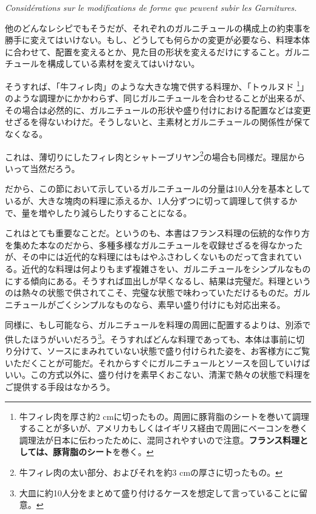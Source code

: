 \begin{main}
\vspace{-1\zw}
\begin{center}
\textit{Considérations sur le modifications de forme que peuvent subir les Garnitures.}
\end{center}
\vspace{1\zw}


他のどんなレシピでもそうだが、それぞれのガルニチュールの構成上の約束事を勝手に変えてはいけない。もし、どうしても何らかの変更が必要なら、料理本体に合わせて、配置を変えるとか、見た目の形状を変えるだけにすること。ガルニチュールを構成している素材を変えてはいけない。

そうすれば、「牛フィレ肉」のような大きな塊で供する料理か、「トゥルヌド
\footnote{牛フィレ肉を厚さ約2
  cmに切ったもの。周囲に豚背脂のシートを巻いて調理することが多いが、アメリカもしくはイギリス経由で周囲にベーコンを巻く調理法が日本に伝わったために、混同されやすいので注意。\textbf{フランス料理としては、豚背脂のシート}を巻く。}」のような調理かにかかわらず、同じガルニチュールを合わせることが出来るが、その場合は必然的に、ガルニチュールの形状や盛り付けにおける配置などは変更せざるを得ないわけだ。そうしないと、主素材とガルニチュールの関係性が保てなくなる。

これは、薄切りにしたフィレ肉とシャトーブリヤン\footnote{牛フィレ肉の太い部分、およびそれを約3
  cmの厚さに切ったもの。}の場合も同様だ。理屈からいって当然だろう。

だから、この節において示しているガルニチュールの分量は10人分を基本としているが、大きな塊肉の料理に添えるか、1人分ずつに切って調理して供するかで、量を増やしたり減らしたりすることになる。

これはとても重要なことだ。というのも、本書はフランス料理の伝統的な作り方を集めた本なのだから、多種多様なガルニチュールを収録せざるを得なかったが、その中には近代的な料理にはもはやふさわしくないものだって含まれている。近代的な料理は何よりもまず複雑さをい、ガルニチュールをシンプルなものにする傾向にある。そうすれば皿出しが早くなるし、結果は完璧だ。料理というのは熱々の状態で供されてこそ、完璧な状態で味わっていただけるものだ。ガルニチュールがごくシンプルなものなら、素早い盛り付けにも対応出来る。

同様に、もし可能なら、ガルニチュールを料理の周囲に配置するよりは、別添で供したほうがいいだろう\footnote{大皿に約10人分をまとめて盛り付けるケースを想定して言っていることに留意。}。そうすればどんな料理であっても、本体は事前に切り分けて、ソースにまみれていない状態で盛り付けられた姿を、お客様方にご覧いただくことが可能だ。それからすぐにガルニチュールとソースを回していけばいい。この方式以外に、盛り付けを素早くおこない、清潔で熱々の状態で料理をご提供する手段はなかろう。


\end{main}
